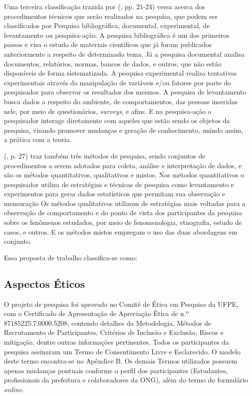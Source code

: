 Uma terceira classificação trazida por \citeauthor{wazlawick2014} (\citeyear{wazlawick2014}, pp. 21-24) versa acerca dos procedimentos técnicos que serão realizados na pesquisa, que podem ser classificados por Pesquisa bibliográfica, documental, experimental, de levantamento ou pesquisa-ação. A pesquisa bibliográfica é um dos primeiros passos e visa o estudo de materiais científicos que já foram publicados anteriormente a respeito de determinado tema. Já a pesquisa documental analisa documentos, relatórios, normas, bancos de dados, e outros, que não estão disponíveis de forma sistematizada. A pesquisa experimental realiza tentativas experimentais através da manipulação de variáveis e/ou fatores por parte do pesquisador para observar os resultados dos mesmos. A pesquisa de levantamento busca dados a respeito do ambiente, de comportamentos, das pessoas inseridas nele, por meio de questionários, \textit{surveys}, e afins. E na pesquisa-ação o pesquisador interage diretamente com aqueles que estão sendo os objetos da pesquisa, visando promover mudanças e geração de conhecimento, unindo assim, a prática com a teoria.

\citeauthor{creswell2007} (\citeyear{creswell2007}, p. 27) traz também três métodos de pesquisa, sendo conjuntos de procedimentos a serem adotados para coleta, análise e interpretação de dados, e são os métodos quantitativos, qualitativos e mistos. Nos métodos quantitativos o pesquisador utiliza de estratégias e técnicas de pesquisa como levantamento e experimentos para gerar dados estatísticos que permitam sua observação e mensuração Os métodos qualitativos utilizam de estratégias mais voltadas para a observação de comportamento e do ponto de vista dos participantes da pesquisa sobre os fenômenos estudados, por meio de fenomenologia, etnografia, estudo de casos, e outros. E os métodos mistos empregam o uso das duas abordagens em conjunto.

Essa proposta de trabalho classifica-se como:









\subsection{Aspectos Éticos}
O projeto de pesquisa foi aprovado no Comitê de Ética em Pesquisa da \gls{UFPE}, com o Certificado de Apresentação de Apreciação Ética de n.º 87185225.7.0000.5208, contendo detalhes da Metodologia, Métodos de Recrutamento de Participantes, Critérios de Inclusão e Exclusão, Riscos e mitigação, dentre outras informações pertinentes. Todos os participantes da pesquisa assinaram um Termo de Consentimento Livre e Esclarecido. O modelo deste termo encontra-se no Apêndice B. Os demais Termos utilizados possuem apenas mudanças pontuais conforme o perfil dos participantes (Estudantes, profissionais da prefeitura e colaboradores da ONG), além do termo do formulário \textit{online}.

